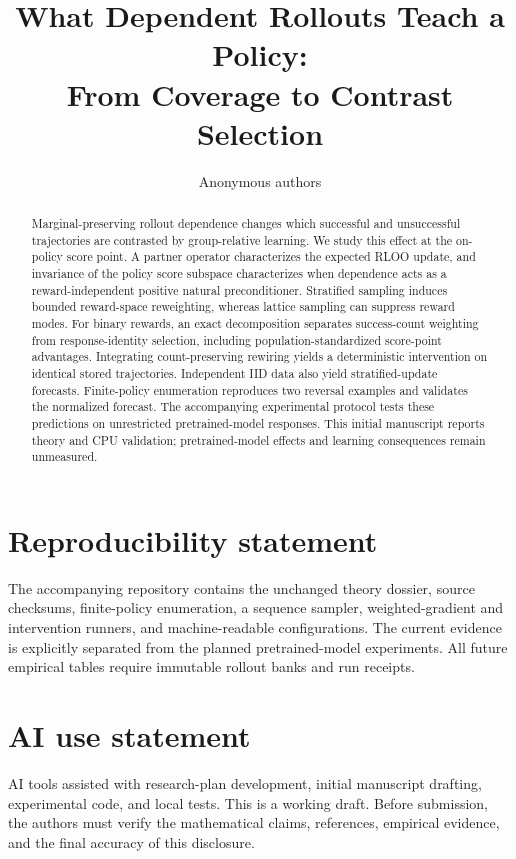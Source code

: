 \documentclass{article}
\title{What Dependent Rollouts Teach a Policy:\\From Coverage to Contrast Selection}
\author{Anonymous authors}
\begin{document}
\maketitle
\begin{abstract}
Marginal-preserving rollout dependence changes which successful and unsuccessful
trajectories are contrasted by group-relative learning. We study this effect at the
on-policy score point. A partner operator characterizes the expected RLOO update,
and invariance of the policy score subspace characterizes when dependence acts as
a reward-independent positive natural preconditioner. Stratified sampling induces
bounded reward-space reweighting, whereas lattice sampling can suppress reward
modes. For binary rewards, an exact decomposition separates success-count weighting
from response-identity selection, including population-standardized score-point
advantages. Integrating count-preserving rewiring yields a deterministic intervention
on identical stored trajectories. Independent IID data also yield stratified-update
forecasts. Finite-policy enumeration reproduces two reversal examples and validates
the normalized forecast. The accompanying experimental protocol tests these predictions
on unrestricted pretrained-model responses. This initial manuscript reports theory
and CPU validation; pretrained-model effects and learning consequences remain unmeasured.
\end{abstract}







\section*{Reproducibility statement}
The accompanying repository contains the unchanged theory dossier, source checksums,
finite-policy enumeration, a sequence sampler, weighted-gradient and intervention
runners, and machine-readable configurations. The current evidence is explicitly
separated from the planned pretrained-model experiments. All future empirical
tables require immutable rollout banks and run receipts.

\section*{AI use statement}
AI tools assisted with research-plan development, initial manuscript drafting,
experimental code, and local tests. This is a working draft. Before submission,
the authors must verify the mathematical claims, references, empirical evidence,
and the final accuracy of this disclosure.



\appendix

\end{document}
